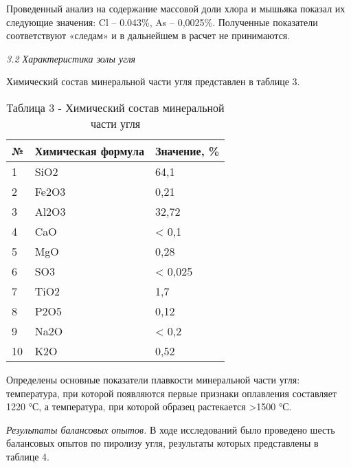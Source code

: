 Проведенный анализ на содержание массовой доли хлора и мышьяка показал
их следующие значения: Cl -- 0.043\%, As -- 0,0025\%. Полученные
показатели соответствуют «следам» и в дальнейшем в расчет не
принимаются.

\emph{3.2 Характеристика золы угля}

Химический состав минеральной части угля представлен в таблице 3.

\begin{table}[H]
\caption*{Таблица 3 - Химический состав минеральной части угля}
\centering
\begin{tabular}{|l|l|l|}
\hline
№ & Химическая формула & Значение, \% \\ \hline
1 & SiO2 & 64,1 \\ \hline
2 & Fe2O3 & 0,21 \\ \hline
3 & Al2O3 & 32,72 \\ \hline
4 & CaO & < 0,1 \\ \hline
5 & MgO & 0,28 \\ \hline
6 & SO3 & < 0,025 \\ \hline
7 & TiO2 & 1,7 \\ \hline
8 & P2O5 & 0,12 \\ \hline
9 & Na2O & < 0,2 \\ \hline
10 & K2O & 0,52 \\ \hline
\end{tabular}
\end{table}

Определены основные показатели плавкости минеральной части угля:
температура, при которой появляются первые признаки оплавления
составляет 1220 °С, а температура, при которой образец растекается
\textgreater1500 °С.

\emph{Результаты балансовых опытов.} В ходе исследований было проведено
шесть балансовых опытов по пиролизу угля, результаты которых
представлены в таблице 4.

